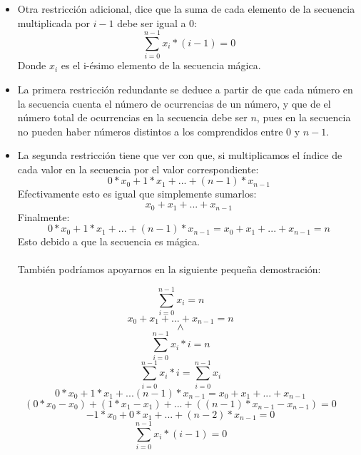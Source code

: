 \documentclass[12pt]{article}
\begin{document}
\begin{itemize}
\begin{itemize}
\item Otra restricción adicional, dice que la suma de cada elemento de la secuencia multiplicada por $i-1$ debe ser igual a 0:
\begin{equation*}
\sum_{i=0}^{n-1} x_{i}*(i-1) = 0
\end{equation*}
Donde $x_{i}$ es el i-ésimo elemento de la secuencia mágica.
\end{itemize}
\begin{itemize}
\item La primera restricción redundante se deduce a partir de que cada número en la secuencia cuenta el número de ocurrencias de un número, y que de el número total de ocurrencias en la secuencia debe ser $n$, pues en la secuencia no pueden haber números distintos a los comprendidos entre $0$ y $n-1$. 
\item La segunda restricción tiene que ver con que, si multiplicamos el índice de cada valor en la secuencia por el valor correspondiente:
\begin{equation*}
0 * x_{0} + 1 * x_{1} + ... + (n-1) * x_{n-1}
\end{equation*}
Efectivamente esto es igual que simplemente sumarlos:
\begin{equation*}
x_{0} + x_{1} + ... + x_{n-1}
\end{equation*}
Finalmente:
\begin{equation*}
0 * x_{0} + 1 * x_{1} + ... + (n-1) * x_{n-1} = x_{0} + x_{1} + ... + x_{n-1} = n
\end{equation*}
Esto debido a que la secuencia es mágica. \\
\\
También podríamos apoyarnos en la siguiente pequeña demostración:
\end{itemize}
\begin{equation*}
\sum_{i=0}^{n-1} x_{i} = n 
\end{equation*}
\begin{equation*}
x_{0} + x_{1} + ... + x_{n-1} = n 
\end{equation*}
\begin{equation*}
\land
\end{equation*}
\begin{equation*}
\sum_{i=0}^{n-1} x_{i} * i = n 
\end{equation*}
\begin{equation*}
\sum_{i=0}^{n-1} x_{i} * i = \sum_{i=0}^{n-1} x_{i}
\end{equation*}
\begin{equation*}
0 * x_{0} + 1 * x_{1} + ... (n-1) * x_{n-1} = x_{0} + x_{1} + ... + x_{n-1}
\end{equation*}
\begin{equation*}
(0 * x_{0} - x_{0}) + (1 * x_{1} - x_{1}) + ... + ((n-1) * x_{n-1} - x_{n-1}) = 0
\end{equation*}
\begin{equation*}
-1 * x_{0} + 0 * x_{1} + ... + (n-2) * x_{n-1} = 0
\end{equation*}
\begin{equation*}
\sum_{i=0}^{n-1} x_{i} * (i-1) = 0 
\end{equation*}
\end{itemize}
\end{document}
